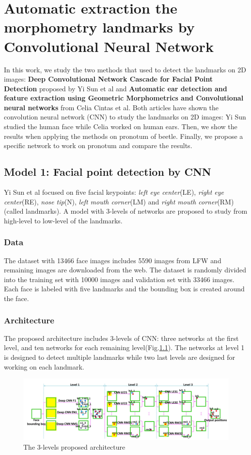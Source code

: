 \chapter{Automatic extraction the morphometry landmarks by Convolutional Neural Network}
In this work, we study the two methods that used to detect the landmarks on 2D images: \textbf{Deep Convolutional Network Cascade for Facial Point Detection} proposed by Yi Sun et al\cite{sun2013deep} and \textbf{Automatic ear detection and feature extraction using Geometric Morphometrics and Convolutional neural networks} from Celia Cintas et al\cite{cintas2016automatic}. Both articles have shown the convolution neural network (CNN) to study the landmarks on 2D images: Yi Sun studied the human face while Celia worked on human ears. Then, we show the results when applying the methods on pronotum of beetle. Finally, we propose a specific network to work on pronotum and compare the results.

\section{Model 1: Facial point detection by CNN}
Yi Sun et al\cite{sun2013deep} focused on five facial keypoints: \textit{left eye center}(LE), \textit{right eye center}(RE), \textit{nose tip}(N), \textit{left mouth corner}(LM) and \textit{right mouth corner}(RM) (called landmarks). A model with 3-levels of networks are proposed to study from high-level to low-level of the landmarks.
\subsection{Data}
The dataset with 13466 face images includes 5590 images from LFW \cite{huang2007labeled} and remaining images are downloaded from the web. The dataset is randomly divided into the training set with 10000 images and validation set with 33466 images. Each face is labeled with five landmarks and the bounding box is created around the face.
\subsection{Architecture}
The proposed architecture includes 3-levels of CNN: three networks at the first level, and ten networks for each remaining level(Fig.\ref{3levels}). The networks at level 1 is designed to detect multiple landmarks while two last levels are designed for working on each landmark.
\begin{figure}[h]
	\centering
	\includegraphics[scale=0.35]{images/3levels}
	\caption{The 3-levels proposed architecture}
	\label{3levels}
\end{figure}

